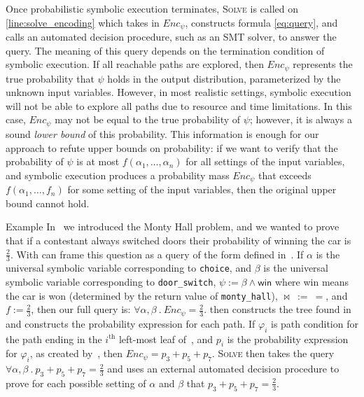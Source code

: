 \documentclass[acmsmall,review,anonymous]{acmart}\settopmatter{printfolios=true,printccs=false,printacmref=false}
\begin{document}
Once probabilistic symbolic execution terminates, \textsc{Solve} is called on \cref{line:solve_encoding} which takes in $Enc_\psi$, constructs formula \ref{eq:query}, and calls an automated decision procedure, such as an SMT solver, to answer the query.
% 
The meaning of this query depends on the termination condition of symbolic execution.
% 
If all reachable paths are explored, then $Enc_\psi$ represents the true probability that $\psi$ holds in the output distribution, parameterized by the unknown input variables.
% 
However, in most realistic settings, symbolic execution will not be able to explore all paths due to resource and time limitations.
% 
In this case, $Enc_\psi$ may not be equal to the true probability of $\psi$; however, it is always a sound \emph{lower bound} of this probability.
% 
This information is enough for our approach to refute upper bounds on
probability: if we want to verify that the probability of $\psi$ is at most $f(\alpha_1,\ldots,\alpha_n)$
for all settings of the input variables, and symbolic execution produces a
probability mass $Enc_\psi$ that exceeds $f(\alpha_1,\ldots,f_n)$ for some setting of the input
variables, then the original upper bound cannot hold.
\begin{paragraph}{Example}
  In~ we introduced the Monty Hall problem, and we wanted to prove that if a contestant always switched doors their probability of winning the car is $\frac{2}{3}$.
  With can frame this question as a query of the form defined in~.
  If $\alpha$ is the universal symbolic variable corresponding to \texttt{choice}, and $\beta$ is the universal symbolic variable corresponding to \texttt{door\_switch}, $\psi := \beta \wedge \mathsf{win}$ where \textsf{win} means the car is won (determined by the return value of \texttt{monty\_hall}), $\bowtie~:=~=$, and $f := \frac{2}{3}$, then our full query is: $\forall \alpha,\beta~.~Enc_\psi = \frac{2}{3}$.
   then constructs the tree found in~ and constructs the probability expression for each path.
  If $\varphi_i$ is path condition for the path ending in the $i^{\text{th}}$ left-most leaf of~, and $p_i$ is the probability expression for $\varphi_i$, as created by~, then $Enc_\psi = p_3 + p_5 + p_7$.
  \textsc{Solve} then takes the query $\forall \alpha,\beta~.~p_3 + p_5 + p_7 = \frac{2}{3}$ and uses an external automated decision procedure to prove for each possible setting of $\alpha$ and $\beta$ that $p_3 + p_5 + p_7 = \frac{2}{3}$.
\end{paragraph}
\end{document}
